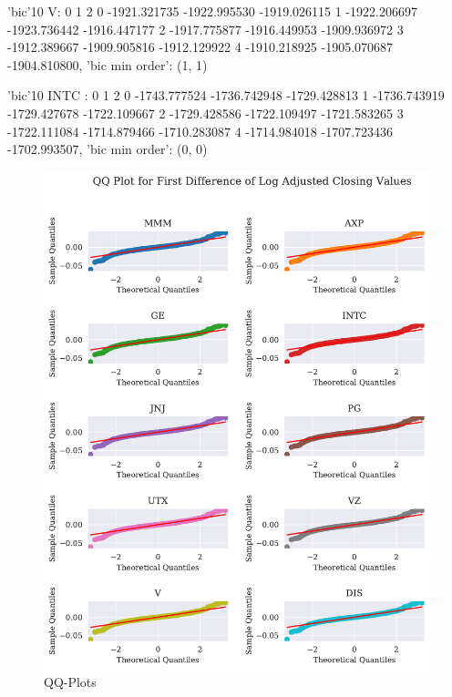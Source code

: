 
'bic'10 V:              0            1            2
0 -1921.321735 -1922.995530 -1919.026115
1 -1922.206697 -1923.736442 -1916.447177
2 -1917.775877 -1916.449953 -1909.936972
3 -1912.389667 -1909.905816 -1912.129922
4 -1910.218925 -1905.070687 -1904.810800, 'bic min order': (1, 1)

'bic'10 INTC :              0            1            2
0 -1743.777524 -1736.742948 -1729.428813
1 -1736.743919 -1729.427678 -1722.109667
2 -1729.428586 -1722.109497 -1721.583265
3 -1722.111084 -1714.879466 -1710.283087
4 -1714.984018 -1707.723436 -1702.993507, 'bic min order': (0, 0)





\begin{figure}[h]
    \centering
    \begin{adjustbox}{width=.9\textwidth,center}
    \includegraphics[]{figures/all_qq_plot_fd_log_adjclose.pdf}
    \end{adjustbox}  
    \caption{QQ-Plots}
    \label{fig:all_qq_fd_log_adjclose}
\end{figure}


